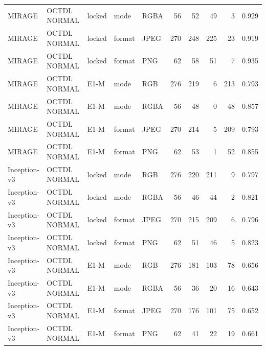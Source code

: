 \begin{longtable}{@{}lllllrrrrc@{}}
MIRAGE & OCTDL NORMAL & locked & mode & RGBA & 56 & 52 & 49 & 3 & 0.929 \\
MIRAGE & OCTDL NORMAL & locked & format & JPEG & 270 & 248 & 225 & 23 & 0.919 \\
MIRAGE & OCTDL NORMAL & locked & format & PNG & 62 & 58 & 51 & 7 & 0.935 \\
MIRAGE & OCTDL NORMAL & E1-M & mode & RGB & 276 & 219 & 6 & 213 & 0.793 \\
MIRAGE & OCTDL NORMAL & E1-M & mode & RGBA & 56 & 48 & 0 & 48 & 0.857 \\
MIRAGE & OCTDL NORMAL & E1-M & format & JPEG & 270 & 214 & 5 & 209 & 0.793 \\
MIRAGE & OCTDL NORMAL & E1-M & format & PNG & 62 & 53 & 1 & 52 & 0.855 \\
Inception-v3 & OCTDL NORMAL & locked & mode & RGB & 276 & 220 & 211 & 9 & 0.797 \\
Inception-v3 & OCTDL NORMAL & locked & mode & RGBA & 56 & 46 & 44 & 2 & 0.821 \\
Inception-v3 & OCTDL NORMAL & locked & format & JPEG & 270 & 215 & 209 & 6 & 0.796 \\
Inception-v3 & OCTDL NORMAL & locked & format & PNG & 62 & 51 & 46 & 5 & 0.823 \\
Inception-v3 & OCTDL NORMAL & E1-M & mode & RGB & 276 & 181 & 103 & 78 & 0.656 \\
Inception-v3 & OCTDL NORMAL & E1-M & mode & RGBA & 56 & 36 & 20 & 16 & 0.643 \\
Inception-v3 & OCTDL NORMAL & E1-M & format & JPEG & 270 & 176 & 101 & 75 & 0.652 \\
Inception-v3 & OCTDL NORMAL & E1-M & format & PNG & 62 & 41 & 22 & 19 & 0.661 \\
\end{longtable}
